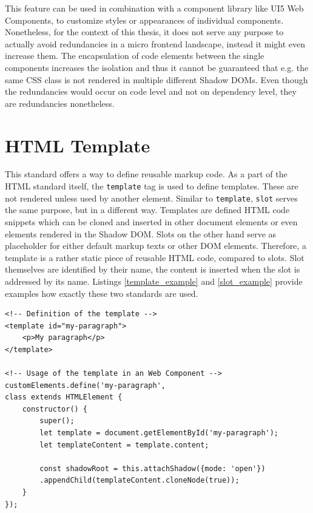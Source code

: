 This feature can be used in combination with a component library like UI5 Web Components, to customize styles or appearances of individual components. Nonetheless, for the context of this thesis, it does not serve any purpose to actually avoid redundancies in a micro frontend landscape, instead it might even increase them. The encapsulation of code elements between the single components increases the isolation and thus it cannot be guaranteed that e.g. the same CSS class is not rendered in multiple different Shadow DOMs. Even though the redundancies would occur on code level and not on dependency level, they are redundancies nonetheless.

\section{HTML Template}

This standard offers a way to define reusable markup code. As a part of the HTML standard itself, the \texttt{template} tag is used to define templates. These are not rendered unless used by another element. Similar to \texttt{template}, \texttt{slot} serves the same purpose, but in a different way. Templates are defined HTML code snippets which can be cloned and inserted in other document elements or even elements rendered in the Shadow DOM.
Slots on the other hand serve as placeholder for either default markup texts or other DOM elements. Therefore, a template is a rather static piece of reusable HTML code, compared to slots.
Slot themselves are identified by their name, the content is inserted when the slot is addressed by its name.
Listings \ref{template_example} and \ref{slot_example} provide examples how exactly these two standards are used. \cite{wc_html_template_slots}

\begin{lstlisting}[caption=Definition and usage of the \texttt{template} standard \cite{wc_html_template_slots}, label=template_example]
<!-- Definition of the template -->
<template id="my-paragraph">
	<p>My paragraph</p>
</template>

<!-- Usage of the template in an Web Component -->
customElements.define('my-paragraph',
class extends HTMLElement {
	constructor() {
		super();
		let template = document.getElementById('my-paragraph');
		let templateContent = template.content;
		
		const shadowRoot = this.attachShadow({mode: 'open'})
		.appendChild(templateContent.cloneNode(true));
	}
});
\end{lstlisting}

